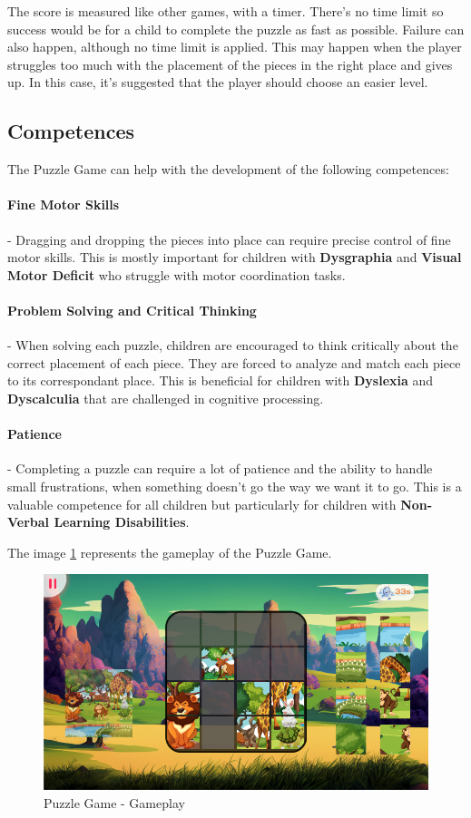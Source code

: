 The score is measured like other games, with a timer. There's no time limit so success would be for a child to complete the puzzle as fast as possible. Failure can also happen, although no time limit is applied. This may happen when the player struggles too much with the placement of the pieces in the right place and gives up. In this case, it's suggested that the player should choose an easier level.

\subsection{Competences}

The Puzzle Game can help with the development of the following competences:

\paragraph{Fine Motor Skills}- Dragging and dropping the pieces into place can require precise control of fine motor skills. This is mostly important for children with \textbf{Dysgraphia} and \textbf{Visual Motor Deficit} who struggle with motor coordination tasks.

\paragraph{Problem Solving and Critical Thinking}- When solving each puzzle, children are encouraged to think critically about the correct placement of each piece. They are forced to analyze and match each piece to its correspondant place. This is beneficial for children with \textbf{Dyslexia} and \textbf{Dyscalculia} that are challenged in cognitive processing.

\paragraph{Patience}- Completing a puzzle can require a lot of patience and the ability to handle small frustrations, when something doesn't go the way we want it to go. This is a valuable competence for all children but particularly for children with \textbf{Non-Verbal Learning Disabilities}.

The image \ref{fig:puzzleGameplay} represents the gameplay of the Puzzle Game.

\begin{figure}[H]
    \centering
    \includegraphics[scale=0.45]{Chapters/gameplay/PuzzleGame.jpg}
    \caption{Puzzle Game - Gameplay}
    \label{fig:puzzleGameplay}    
\end{figure}